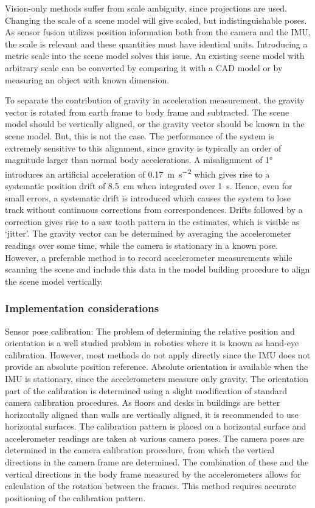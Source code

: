 Vision-only methods suffer from scale ambiguity, since projections are used. Changing the scale of a scene model will give scaled, but indistinguishable poses. As sensor fusion utilizes position information both from the camera and the IMU, the scale is relevant and these quantities must have identical units. Introducing a metric scale into the scene model solves this issue. An existing scene model with arbitrary scale can be converted by comparing it with a CAD model or by measuring an object with known dimension.

To separate the contribution of gravity in acceleration measurement, the gravity vector is rotated from earth frame to body frame and subtracted. The scene model should be vertically aligned, or the gravity vector should be known in the scene model. But, this is not the case. The performance of the system is extremely sensitive to this alignment, since gravity is typically an order of magnitude larger than normal body accelerations. A misalignment of \ang{1} introduces an artificial acceleration of \SI{0.17}{\m\per\s\squared} which gives rise to a systematic position drift of \SI{8.5}{\cm} when integrated over \SI{1}{\s}. Hence, even for small errors, a systematic drift is introduced which causes the system to lose track without continuous corrections from correspondences. Drifts followed by a correction gives rise to a saw tooth pattern in the estimates, which is visible as `jitter'. The gravity vector can be determined by averaging the accelerometer readings over some time, while the camera is stationary in a known pose. However, a preferable method is to record accelerometer measurements while scanning the scene and include this data in the model building procedure to align the scene model vertically.


\subsubsection{Implementation considerations}  

Sensor pose calibration: The problem of determining the relative position and orientation is a well studied problem in robotics where it is known as hand-eye calibration. However, most methods do not apply directly since the IMU does not provide an absolute position reference. Absolute orientation is available when the IMU is stationary, since the accelerometers measure only gravity. The orientation part of the calibration is determined using a slight modification of standard camera calibration procedures. As floors and desks in buildings are better horizontally aligned than walls are vertically aligned, it is recommended to use horizontal surfaces. The calibration pattern is placed on a horizontal surface and accelerometer readings are taken at various camera poses. The camera poses are determined in the camera calibration procedure, from which the vertical directions in the camera frame are determined. The combination of these and the vertical directions in the body frame measured by the accelerometers allows for calculation of the rotation between the frames. This method requires accurate positioning of the calibration pattern. 

